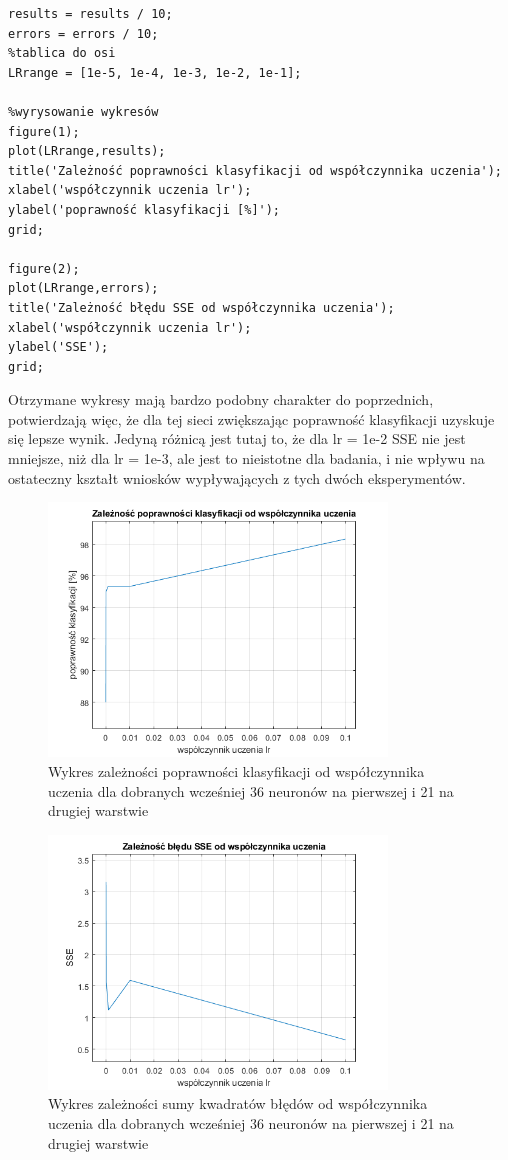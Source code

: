 \documentclass[a4paper, 12pt]{article}
\begin{document}
\begin{lstlisting}[frame=single, caption=Skrypt do analizy dotyczącej wpływu wartości współczynnika uczenia przy ustalonej ilości neuronów na uczenie sieci]
%obliczenie średnich wyników
results = results / 10;
errors = errors / 10;
%tablica do osi
LRrange = [1e-5, 1e-4, 1e-3, 1e-2, 1e-1];

%wyrysowanie wykresów
figure(1);
plot(LRrange,results);
title('Zależność poprawności klasyfikacji od współczynnika uczenia');
xlabel('współczynnik uczenia lr');
ylabel('poprawność klasyfikacji [%]');
grid;

figure(2);
plot(LRrange,errors);
title('Zależność błędu SSE od współczynnika uczenia');
xlabel('współczynnik uczenia lr');
ylabel('SSE');
grid;
\end{lstlisting}

\clearpage
Otrzymane wykresy mają bardzo podobny charakter do poprzednich, potwierdzają więc, że dla tej sieci zwiększając poprawność klasyfikacji uzyskuje się lepsze wynik. Jedyną różnicą jest tutaj to, że dla lr = 1e-2 SSE nie jest mniejsze, niż dla lr = 1e-3, ale jest to nieistotne dla badania, i nie wpływu na ostateczny kształt wniosków wypływających z tych dwóch eksperymentów.

\begin{figure}[ht]
	\centering
	\includegraphics[width=9cm]{3621 pk}
	\caption{Wykres zależności poprawności klasyfikacji od współczynnika uczenia dla dobranych wcześniej 36 neuronów na pierwszej i 21 na drugiej warstwie}
\label{Fig:lr1 sse dane}
\end{figure}

\begin{figure}[ht]
	\centering
	\includegraphics[width=9cm]{3621 sse}
	\caption{Wykres zależności sumy kwadratów błędów od współczynnika uczenia dla dobranych wcześniej 36 neuronów na pierwszej i 21 na drugiej warstwie}
\label{Fig:lr1 sse dane}
\end{figure}
\end{document}
